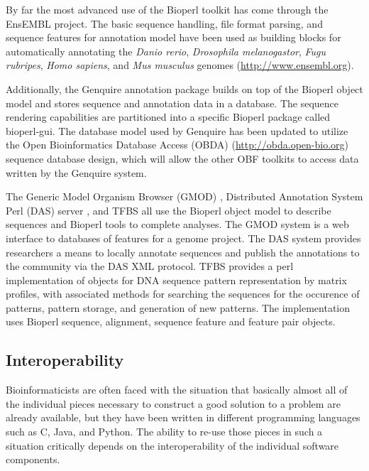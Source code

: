 \documentclass[12pt]{article}
\begin{document}
By far the most advanced use of the Bioperl toolkit has come through
the EnsEMBL\cite{ensembl-nar} project.  The basic sequence handling,
file format parsing, and sequence features for annotation model have
been used as building blocks for automatically annotating the
\textit{Danio rerio}, \textit{Drosophila melanogastor}, \textit{Fugu
rubripes}, \textit{Homo sapiens}, and \textit{Mus musculus} genomes
(\url{http://www.ensembl.org}).

Additionally, the Genquire\cite{genquire} annotation package builds on
top of the Bioperl object model and stores sequence and annotation
data in a database.  The sequence rendering capabilities are
partitioned into a specific Bioperl package called bioperl-gui. 
The database model used by Genquire has been updated to utilize the
Open Bioinformatics Database Access (OBDA)
(\url{http://obda.open-bio.org}) sequence database design, which will
allow the other OBF toolkits to access data written by the Genquire
system.

The Generic Model Organism Browser (GMOD) \cite{gmod}, Distributed
Annotation System Perl (DAS) server \cite{das}, and TFBS
\cite{tfbs} all use the Bioperl object model to describe sequences and
Bioperl tools to complete analyses.  The GMOD system is a web
interface to databases of features for a genome project.  The DAS
system provides researchers a means to locally annotate sequences and
publish the annotations to the community via the DAS XML protocol.
TFBS provides a perl implementation of objects for DNA sequence pattern
representation by matrix profiles, with associated methods for searching
the sequences for the occurence of patterns, pattern storage, and
generation of new patterns. The implementation uses Bioperl sequence,
alignment, sequence feature and feature pair objects.

\subsection{Interoperability}

Bioinformaticists are often faced with the situation that basically
almost all of the individual pieces necessary to construct a good
solution to a problem are already available, but they have been
written in different programming languages such as C, Java, and
Python. The ability to re-use those pieces in such a situation
critically depends on the interoperability of the individual software
components.
\end{document}
